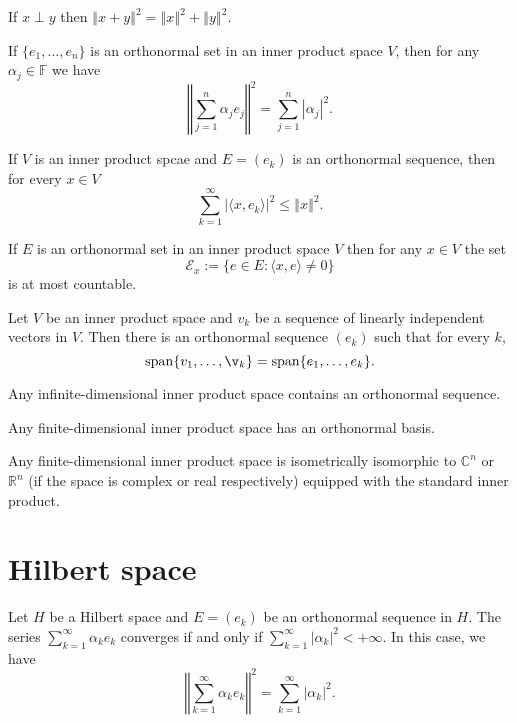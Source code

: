 \documentclass[a4paper]{article}
\newcommand{\F}{\mathbb{F}}
\newcommand{\R}{\mathbb{R}}
\newcommand{\C}{\mathbb{C}}
\newcommand{\norm}[1]{\left\Vert #1 \right\Vert}
\newcommand{\<}{\langle}
\renewcommand{\>}{\rangle}
\renewcommand{\a}{\alpha}
\renewcommand{\span}{\mathrm{span}}
\begin{document}
\begin{thm}[Pythagoras]
  If $x\perp y$ then $\norm{x+y}^2 = \norm{x}^2 + \norm{y}^2$.
\end{thm}

\begin{lemma}
  If $\{e_1,\ldots,e_n\}$ is an orthonormal set in an inner product space $V$, then for any $\a_j\in\F$ we have
  $$\norm{\sum_{j=1}^n\a_j e_j}^2 = \sum_{j=1}^n|\a_j|^2.$$
\end{lemma}

\begin{lemma}
  If $V$ is an inner product spcae and $E=(e_k)$ is an orthonormal sequence, then for every $x\in V$
  $$\sum_{k=1}^\infty|\<x,e_k\>|^2\leq\norm{x}^2.$$
\end{lemma}

\begin{prop}
  If $E$ is an orthonormal set in an inner product space $V$ then for any $x\in V$ the set
  $$\mathcal{E}_x := \{e\in E: \<x,e\>\neq0\}$$
  is at most countable.
\end{prop}

\begin{lemma}
  Let $V$ be an inner product space and $v_k$ be a sequence of linearly independent vectors in $V$. Then there is an orthonormal sequence $(e_k)$ such that for every $k$,
  $$\span\{v_1,\ldots,\v_k\} = \span\{e_1,\ldots,e_k\}.$$
\end{lemma}

\begin{prop}
  Any infinite-dimensional inner product space contains an orthonormal sequence.
\end{prop}

\begin{prop}
  Any finite-dimensional inner product space has an orthonormal basis.
\end{prop}

\begin{prop}
  Any finite-dimensional inner product space is isometrically isomorphic to $\C^n$ or $\R^n$ (if the space is complex or real respectively) equipped with the standard inner product.
\end{prop}

\section{Hilbert space}

\begin{lemma}
  Let $H$ be a Hilbert space and $E=(e_k)$ be an orthonormal sequence in $H$. The series $\sum_{k=1}^\infty \a_k e_k$ converges if and only if $\sum_{k=1}^\infty |\a_k|^2 < +\infty$. In this case, we have
  $$\norm{\sum_{k=1}^\infty \a_k e_k}^2 = \sum_{k=1}^\infty|\a_k|^2.$$
\end{lemma}
\end{document}
